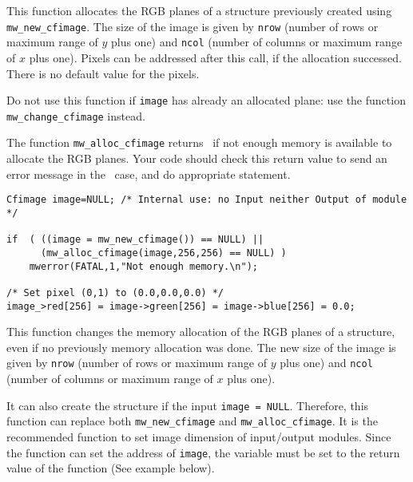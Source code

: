 \Description
This function allocates the RGB planes of a \cfimage structure previously
created using \verb+mw_new_cfimage+. The size of the image is given by 
\verb+nrow+ (number of rows or maximum range of $y$ plus one) and \verb+ncol+
(number of columns or maximum range of $x$ plus one).
Pixels can be addressed after this call, if the allocation successed. There is
no default value for the pixels.

Do not use this function if \verb+image+ has already an allocated plane: use
the function \verb+mw_change_cfimage+ instead.

The function \verb+mw_alloc_cfimage+ returns \Null\ if not enough memory is available to allocate the RGB planes. Your code should check this return value to 
send an error message in the \Null\ case, and do appropriate statement.

\Next
\Example
\begin{verbatim}
Cfimage image=NULL; /* Internal use: no Input neither Output of module */

if  ( ((image = mw_new_cfimage()) == NULL) ||
      (mw_alloc_cfimage(image,256,256) == NULL) )
    mwerror(FATAL,1,"Not enough memory.\n");

/* Set pixel (0,1) to (0.0,0.0,0.0) */
image_>red[256] = image->green[256] = image->blue[256] = 0.0;
\end{verbatim}

\newpage %
\Description
This function changes the memory allocation of the RGB planes of a \cfimage
structure, even if no previously memory allocation was done.
The new size of the image is given by \verb+nrow+ (number of rows or maximum 
range of $y$ plus one) and \verb+ncol+ (number of columns or maximum range of 
$x$ plus one). 

It can also create the structure if the input \verb+image = NULL+.
Therefore, this function can replace both \verb+mw_new_cfimage+ and
\verb+mw_alloc_cfimage+. It is the recommended function to set image 
dimension of input/output modules. 
Since the function can set the address of \verb+image+, the variable must be set to the return value of the function (See example below).

